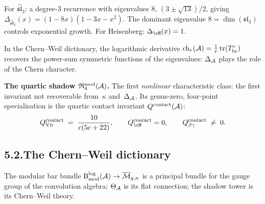 For $\widehat{\mathfrak{sl}}_3$: a degree-$3$ recurrence with
eigenvalues $8$, $(3\pm\sqrt{13})/2$, giving
$\Delta_{\widehat{\mathfrak{sl}}_3}(x)
=(1-8x)(1-3x-x^2)$. The dominant eigenvalue
$8=\dim(\mathfrak{sl}_3)$ controls exponential growth. For
Heisenberg: $\Delta_{\cH}(x)=1$.

In the Chern--Weil dictionary, the logarithmic derivative
$\operatorname{ch}_r(\mathcal{A})
=\frac{1}{r}\operatorname{tr}(T_{\mathrm{br}}^r)$
recovers the power-sum symmetric functions of the eigenvalues:
$\Delta_{\mathcal{A}}$ plays the role of the Chern character.

\medskip

\noindent\textbf{The quartic shadow
$\mathfrak R^{\mathrm{mod}}_{4}(\mathcal{A})$.}\enspace
The first \emph{nonlinear} characteristic class: the first
invariant not recoverable from~$\kappa$ and~$\Delta_{\mathcal{A}}$. Its
genus-zero, four-point specialisation is the quartic contact
invariant $Q^{\mathrm{contact}}(\mathcal{A})$:
\[
Q^{\mathrm{contact}}_{\mathrm{Vir}}
\;=\;
\frac{10}{c(5c+22)},
\qquad
Q^{\mathrm{contact}}_{\cH}=0,
\qquad
Q^{\mathrm{contact}}_{\beta\gamma}
\;\neq\; 0.
\]

\subsection*{5.2.\enspace The Chern--Weil dictionary}

The modular bar bundle
$\mathrm{B}^{\log}_{\mathrm{mod}}(\mathcal{A})\to\overline{\mathcal{M}}_{g,n}$
is a principal bundle for the gauge group of the convolution
algebra; $\Theta_{\mathcal{A}}$ is its flat connection; the shadow
tower is its Chern--Weil theory.


